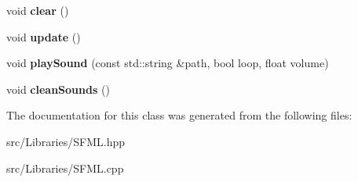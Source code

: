 \begin{DoxyCompactItemize}
void {\bfseries clear} ()
\item 
\mbox{\label{class_arcade_1_1_s_f_m_l_a1f7d18216be0a233c08ab8306d0188f9}} 
void {\bfseries update} ()
\item 
\mbox{\label{class_arcade_1_1_s_f_m_l_a4edffe9197a038ecc84af72f91976e6d}} 
void {\bfseries play\+Sound} (const std\+::string \&path, bool loop, float volume)
\item 
\mbox{\label{class_arcade_1_1_s_f_m_l_a391fc7d78f675a3d0f88af2b9ec91d12}} 
void {\bfseries clean\+Sounds} ()
\end{DoxyCompactItemize}


The documentation for this class was generated from the following files\+:\begin{DoxyCompactItemize}
\item 
src/\+Libraries/S\+F\+M\+L.\+hpp\item 
src/\+Libraries/S\+F\+M\+L.\+cpp\end{DoxyCompactItemize}
